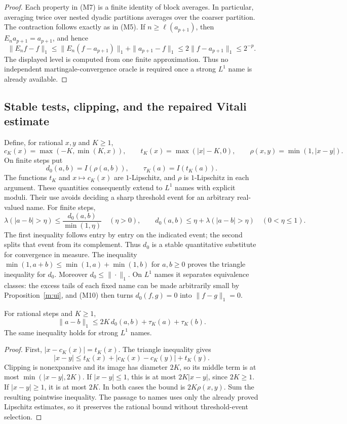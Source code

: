 \begin{proof}
Each property in (M7) is a finite identity of block averages.  In particular,
averaging twice over nested dyadic partitions averages over the coarser
partition.  The contraction follows exactly as in (M5).  If
\(n\ge\ell(a_{p+1})\), then \(E_n a_{p+1}=a_{p+1}\), and hence
\[
 \|E_nf-f\|_1
 \le\|E_n(f-a_{p+1})\|_1+\|a_{p+1}-f\|_1
 \le2\|f-a_{p+1}\|_1\le2^{-p}.
 \]
The displayed level is computed from one finite approximation.  Thus no
independent martingale-convergence oracle is required once a strong
\(L^1\) name is already available.
\end{proof}

\subsection{Stable tests, clipping, and the repaired Vitali estimate}

Define, for rational \(x,y\) and \(K\ge1\),
\[
 c_K(x)=\max(-K,\min(K,x)),\qquad
 t_K(x)=\max(|x|-K,0),\qquad
 \rho(x,y)=\min(1,|x-y|).
\]
On finite steps put
\[
 d_0(a,b)=I(\rho(a,b)),\qquad \tau_K(a)=I(t_K(a)).
\]
The functions \(t_K\) and \(x\mapsto c_K(x)\) are \(1\)-Lipschitz, and
\(\rho\) is \(1\)-Lipschitz in each argument.  These quantities consequently
extend to \(L^1\) names with explicit moduli.  Their use avoids deciding a
sharp threshold event for an arbitrary real-valued name.  For finite steps,
\[
 \lambda(|a-b|>\eta)\le \frac{d_0(a,b)}{\min(1,\eta)}
 \quad(\eta>0),
 \qquad
 d_0(a,b)\le\eta+\lambda(|a-b|>\eta)\quad(0<\eta\le1).
 \tag{M9}
\]
The first inequality follows entry by entry on the indicated event; the
second splits that event from its complement.  Thus \(d_0\) is a stable
quantitative substitute for convergence in measure.
The inequality
\(\min(1,a+b)\le\min(1,a)+\min(1,b)\) for \(a,b\ge0\) proves the triangle
inequality for \(d_0\).  Moreover \(d_0\le\|\cdot\|_1\).
On \(L^1\) names it separates equivalence classes: the excess tails of each
fixed name can be made arbitrarily small by Proposition~\ref{m:ui}, and
(M10) then turns \(d_0(f,g)=0\) into \(\|f-g\|_1=0\).

\begin{lemma}\label{m:clipping}
For rational steps and \(K\ge1\),
\[
 \|a-b\|_1
 \le 2K\,d_0(a,b)+\tau_K(a)+\tau_K(b).
 \tag{M10}
\]
The same inequality holds for strong \(L^1\) names.
\end{lemma}

\begin{proof}
First, \(|x-c_K(x)|=t_K(x)\).  The triangle inequality gives
\[
 |x-y|\le t_K(x)+|c_K(x)-c_K(y)|+t_K(y).
 \]
Clipping is nonexpansive and its image has diameter \(2K\), so its middle
term is at most \(\min(|x-y|,2K)\).  If \(|x-y|\le1\), this is at most
\(2K|x-y|\), since \(2K\ge1\).  If \(|x-y|\ge1\), it is at most \(2K\).
In both cases the bound is \(2K\rho(x,y)\).  Sum the resulting pointwise
inequality.  The passage to names uses only the already proved Lipschitz
estimates, so it preserves the rational bound without threshold-event
selection.
\end{proof}

